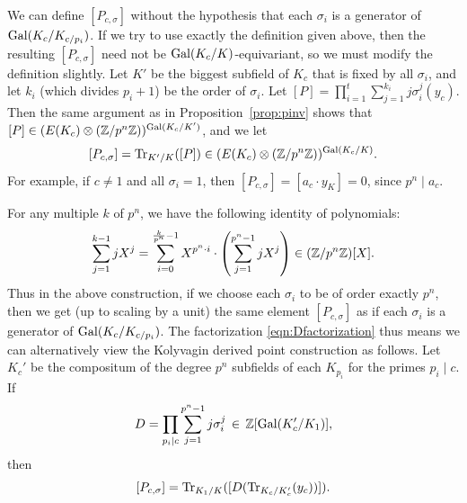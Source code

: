 \documentclass{article} \usepackage[active]{srcltx}
\begin{document}
\begin{remark}\label{rem:pn}
  We can define $[P_{c,\sigma}]$ without the hypothesis that each
  $\sigma_i$ is a generator of $\operatorname{Gal}(K_c/K_{c/p_i})$.  If we try to
  use exactly the definition given above, then the resulting
  $[P_{c,\sigma}]$ need not be $\operatorname{Gal}(K_c/K)$-equivariant, so we must modify
  the definition slightly.  Let $K'$ be the biggest subfield of $K_c$ that is
  fixed by all $\sigma_i$, and let $k_i$ (which divides $p_i+1$) be
  the order of $\sigma_i$.  Let 
  $[P] = \prod_{i=1}^t \sum_{j=1}^{k_i} j \sigma_i^j(y_c)$.  Then the same argument as in
  Proposition~\ref{prop:pinv} shows that $[P] \in (E(K_c)\otimes
  (\mathbb{Z}/p^n\mathbb{Z}))^{\operatorname{Gal}(K_c/K')}$, and we let
$$
 [P_{c,\sigma}] = \operatorname{Tr}_{K'/K}([P]) \in (E(K_c)\otimes (\mathbb{Z}/p^n\mathbb{Z}))^{\operatorname{Gal}(K_c/K)}.
$$
For example, if $c\neq 1$ and all $\sigma_i=1$, then $[P_{c,\sigma}] =
[a_c \cdot y_K]=0$, since $p^n\mid a_c$.

For any multiple $k$ of $p^n$, we have
the following identity of polynomials:
\begin{equation}\label{eqn:Dfactorization}
  \sum_{j=1}^{k-1} j X^j = \sum_{i=0}^{\frac{k}{p^n}-1} X^{p^n \cdot i} \cdot \left( \sum_{j=1}^{p^n-1} j X^j \right) 
    \in (\mathbb{Z}/p^n\mathbb{Z})[X].
  \end{equation}
Thus in the above construction, if we choose each $\sigma_i$ to be of
order exactly $p^n$, then we get (up to scaling by a unit) the same
element $[P_{c,\sigma}]$ as if each $\sigma_i$ is a generator of
$\operatorname{Gal}(K_{c}/K_{c/p_i})$.   
The factorization \eqref{eqn:Dfactorization} thus means we can 
alternatively
view the Kolyvagin derived point construction as follows.
Let $K_c'$ be the compositum of the degree $p^n$ subfields of each
$K_{p_i}$ for the primes $p_i\mid c$.  If
$$ 
 D = \prod_{p_i\mid c} \sum_{j=1}^{p^n-1} j \sigma_i^j \, \in\,  \mathbb{Z}[\operatorname{Gal}(K_c'/K_1)],
$$
then
$$
 [P_{c,\sigma}] = \operatorname{Tr}_{K_1/K}([D(\operatorname{Tr}_{K_c/K_c'}(y_c))]).
$$
\end{remark}


\end{document}
